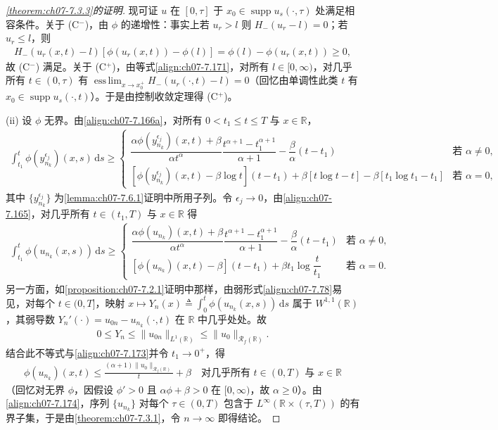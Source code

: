 \documentclass[../../main.tex]{subfiles}%
\begin{document}
\begin{proof}[\cref{theorem:ch07-7.3.3}的证明]
现可证 $u$ 在 $[0,\tau]$ 于 $x_0\in\operatorname{supp}u_s(\cdot,\tau)$ 处满足相容条件。关于 (C$^-$)，由 $\phi$ 的递增性：事实上若 $u_r>l$ 则 $H_-(u_r-l)=0$；若 $u_r\leqslant l$，则
\begin{align*}
H_-(u_r(x,t)-l)[\phi(u_r(x,t))-\phi(l)]=\phi(l)-\phi(u_r(x,t))\geqslant0,
\end{align*}
故 (C$^-$) 满足。关于 (C$^+$)，由等式\eqref{align:ch07-7.171}，对所有 $l\in[0,\infty)$，对几乎所有 $t\in(0,\tau)$ 有 $\operatorname*{ess\,lim}_{x\to x_0^+}H_-(u_r(\cdot,t)-l)=0$（回忆由单调性此类 $t$ 有 $x_0\in\operatorname{supp}u_s(\cdot,t)$）。于是由控制收敛定理得 (C$^+$)。

(ii) 设 $\phi$ 无界。由\eqref{align:ch07-7.166a}，对所有 $0<t_1\leqslant t\leqslant T$ 与 $x\in\mathbb{R}$，
\begin{align*}
\int_{t_1}^t\phi(y_{n_k}^{\epsilon_j})(x,s)\,\mathrm{d}s
\geqslant
\begin{cases}
\dfrac{\alpha\phi(y_{n_k}^{\epsilon_j})(x,t)+\beta}{\alpha t^\alpha}\dfrac{t^{\alpha+1}-t_1^{\alpha+1}}{\alpha+1}-\dfrac{\beta}{\alpha}(t-t_1)&\text{若 }\alpha\neq0,\\[2mm]
[\phi(y_{n_k}^{\epsilon_j})(x,t)-\beta\log t](t-t_1)+\beta[t\log t-t]-\beta[t_1\log t_1-t_1]&\text{若 }\alpha=0,
\end{cases}
\end{align*}
其中 $\{y_{n_k}^{\epsilon_j}\}$ 为\cref{lemma:ch07-7.6.1}证明中所用子列。令 $\epsilon_j\to0$，由\eqref{align:ch07-7.165}，对几乎所有 $t\in(t_1,T)$ 与 $x\in\mathbb{R}$ 得
\begin{align}
\int_{t_1}^t\phi(u_{n_k}(x,s))\,\mathrm{d}s\geqslant
\begin{cases}
\dfrac{\alpha\phi(u_{n_k})(x,t)+\beta}{\alpha t^\alpha}\dfrac{t^{\alpha+1}-t_1^{\alpha+1}}{\alpha+1}-\dfrac{\beta}{\alpha}(t-t_1)&\text{若 }\alpha\neq0,\\
[\phi(u_{n_k})(x,t)-\beta](t-t_1)+\beta t_1\log\dfrac{t}{t_1}&\text{若 }\alpha=0.
\end{cases} \label{align:ch07-7.173}
\end{align}
另一方面，如\cref{proposition:ch07-7.2.1}证明中那样，由弱形式\eqref{align:ch07-7.78}易见，对每个 $t\in(0,T]$，映射 $x\mapsto Y_n(x)\triangleq \int_0^t\phi(u_{n_k}(x,s))\,\mathrm{d}s$ 属于 $W^{1,1}(\mathbb{R})$，其弱导数 $Y_n'(\cdot)=u_{0n}-u_{n_k}(\cdot,t)$ 在 $\mathbb{R}$ 中几乎处处。故
\begin{align*}
0\leqslant Y_n\leqslant\|u_{0n}\|_{L^1(\mathbb{R})}\leqslant\|u_0\|_{\mathscr{R}_f(\mathbb{R})}.
\end{align*}
结合此不等式与\eqref{align:ch07-7.173}并令 $t_1\to0^+$，得
\begin{align}
\phi(u_{n_k})(x,t)\leqslant\frac{(\alpha+1)\|u_0\|_{\mathscr{R}_f(\mathbb{R})}}{t}+\beta
\quad\text{对几乎所有 }t\in(0,T)\text{ 与 }x\in\mathbb{R} \label{align:ch07-7.174}
\end{align}
（回忆对无界 $\phi$，因假设 $\phi'>0$ 且 $\alpha\phi+\beta>0$ 在 $[0,\infty)$，故 $\alpha\geqslant0$）。由\eqref{align:ch07-7.174}，序列 $\{u_{n_k}\}$ 对每个 $\tau\in(0,T)$ 包含于 $L^\infty(\mathbb{R}\times(\tau,T))$ 的有界子集，于是由\cref{theorem:ch07-7.3.1}，令 $n\to\infty$ 即得结论。
\end{proof}
\end{document}
